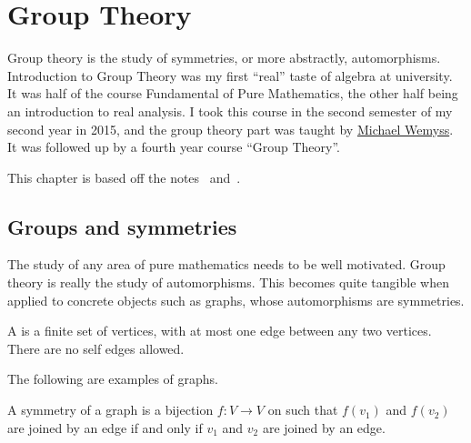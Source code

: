 \chapter{Group Theory}\label{cha:intr-group-theory}
Group theory is the study of symmetries, or more abstractly, automorphisms.
%
Introduction to Group Theory was my first ``real'' taste of algebra at university.
%
It was half of the course Fundamental of Pure Mathematics, the other half being an introduction to real analysis.
%
I took this course in the second semester of my second year in 2015, and the group theory part was taught by \href{https://www.maths.gla.ac.uk/~mwemyss/}{Michael Wemyss}.
%
It was followed up by a fourth year course ``Group Theory''.


This chapter is based off the notes~\cite{wemyss2015grouptheory} and~\cite{lanini2017grouptheory}.



\section{Groups and symmetries}
The study of any area of pure mathematics needs to be well motivated.
%
Group theory is really the study of automorphisms.
%
This becomes quite tangible when applied to concrete objects such as graphs, whose automorphisms are symmetries.


\begin{definition}\cite[Definition 1.1.1]{wemyss2015grouptheory}\label{def:intr-group-theory:graph}
  A  is a finite set of vertices, with at most one edge between any two vertices.
  There are no self edges allowed.
\end{definition}

\begin{example}
  The following are examples of graphs.

  \begin{center}
  \end{center}
\end{example}

\begin{definition}\cite[Definition 1.1.3]{wemyss2015grouptheory}
  A symmetry of a graph is a bijection \(f : V \to V\) on such that \(f(v_{1})\) and \(f(v_{2})\) are joined by an edge if and only if \(v_{1}\) and \(v_{2}\) are joined by an edge.
\end{definition}

